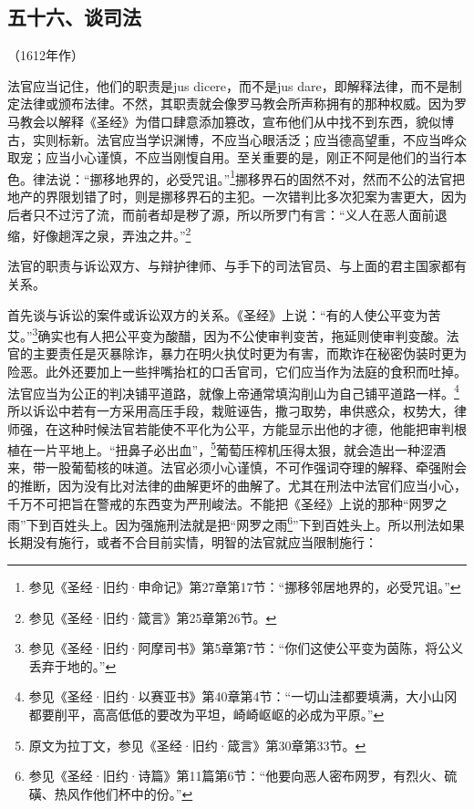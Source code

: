 \subsection*{五十六、谈司法}
\begin{center}
    （1612年作）
\end{center}
\par 法官应当记住，他们的职责是jus dicere，而不是jus dare，即解释法律，而不是制定法律或颁布法律。不然，其职责就会像罗马教会所声称拥有的那种权威。因为罗马教会以解释《圣经》为借口肆意添加篡改，宣布他们从中找不到东西，貌似博古，实则标新。法官应当学识渊博，不应当心眼活泛；应当德高望重，不应当哗众取宠；应当小心谨慎，不应当刚愎自用。至关重要的是，刚正不阿是他们的当行本色。律法说：“挪移地界的，必受咒诅。”\footnote{参见《圣经·旧约·申命记》第27章第17节：“挪移邻居地界的，必受咒诅。”}挪移界石的固然不对，然而不公的法官把地产的界限划错了时，则是挪移界石的主犯。一次错判比多次犯案为害更大，因为后者只不过污了流，而前者却是秽了源，所以所罗门有言：“义人在恶人面前退缩，好像趟浑之泉，弄浊之井。”\footnote{参见《圣经·旧约·箴言》第25章第26节。}
\par 法官的职责与诉讼双方、与辩护律师、与手下的司法官员、与上面的君主国家都有关系。
\par 首先谈与诉讼的案件或诉讼双方的关系。《圣经》上说：“有的人使公平变为苦艾。”\footnote{参见《圣经·旧约·阿摩司书》第5章第7节：“你们这使公平变为茵陈，将公义丢弃于地的。”}确实也有人把公平变为酸醋，因为不公使审判变苦，拖延则使审判变酸。法官的主要责任是灭暴除诈，暴力在明火执仗时更为有害，而欺诈在秘密伪装时更为险恶。此外还要加上一些拌嘴抬杠的口舌官司，它们应当作为法庭的食积而吐掉。法官应当为公正的判决铺平道路，就像上帝通常填沟削山为自己铺平道路一样。\footnote{参见《圣经·旧约·以赛亚书》第40章第4节：“一切山洼都要填满，大小山冈都要削平，高高低低的要改为平坦，崎崎岖岖的必成为平原。”}所以诉讼中若有一方采用高压手段，栽赃诬告，撒刁取势，串供惑众，权势大，律师强，在这种时候法官若能使不平化为公平，方能显示出他的才德，他能把审判根植在一片平地上。“扭鼻子必出血”，\footnote{原文为拉丁文，参见《圣经·旧约·箴言》第30章第33节。}葡萄压榨机压得太狠，就会造出一种涩酒来，带一股葡萄核的味道。法官必须小心谨慎，不可作强词夺理的解释、牵强附会的推断，因为没有比对法律的曲解更坏的曲解了。尤其在刑法中法官们应当小心，千万不可把旨在警戒的东西变为严刑峻法。不能把《圣经》上说的那种“网罗之雨”下到百姓头上。因为强施刑法就是把“网罗之雨\footnote{参见《圣经·旧约·诗篇》第11篇第6节：“他要向恶人密布网罗，有烈火、硫磺、热风作他们杯中的份。”}”下到百姓头上。所以刑法如果长期没有施行，或者不合目前实情，明智的法官就应当限制施行：
